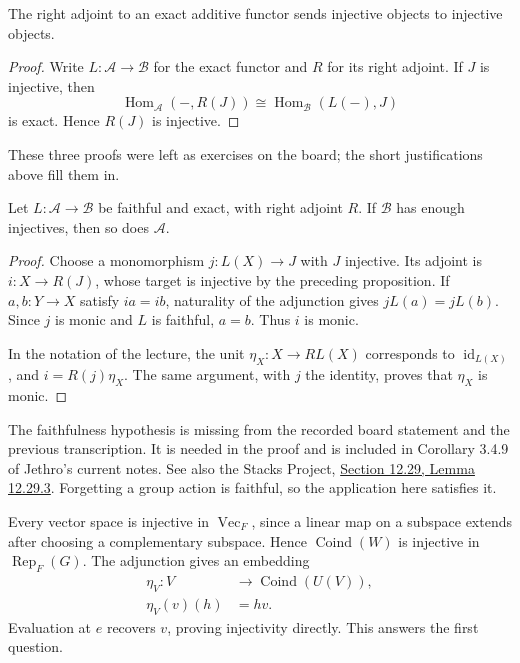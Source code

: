 \begin{proposition}
\label{proposition-adjoint-injective-4-sept}
The right adjoint to an exact additive
functor sends injective objects to
injective objects.
\end{proposition}

\begin{proof}
Write $L:\mathcal A\to\mathcal B$ for
the exact functor and $R$ for its right
adjoint. If $J$ is injective, then
$$
\operatorname{Hom}_{\mathcal A}(-,R(J))
\cong\operatorname{Hom}_{\mathcal B}(L(-),J)
$$
is exact. Hence $R(J)$ is injective.
\end{proof}

\noindent
These three proofs were left as exercises
on the board; the short justifications
above fill them in.

\begin{corollary}
\label{lemma-adjoint-injectives-4-sept}
Let $L:\mathcal A\to\mathcal B$ be
faithful and exact, with right adjoint
$R$. If $\mathcal B$ has enough
injectives, then so does $\mathcal A$.
\end{corollary}

\begin{proof}
Choose a monomorphism $j:L(X)\to J$
with $J$ injective. Its adjoint is
$i:X\to R(J)$, whose target is injective
by the preceding proposition.
If $a,b:Y\to X$ satisfy $ia=ib$,
naturality of the adjunction gives
$jL(a)=jL(b)$. Since $j$ is monic and
$L$ is faithful, $a=b$. Thus $i$ is monic.

In the notation of the lecture, the unit
$\eta_X:X\to RL(X)$ corresponds to
$\operatorname{id}_{L(X)}$, and
$i=R(j)\eta_X$. The same argument, with
$j$ the identity, proves that $\eta_X$
is monic.
\end{proof}

\begin{remark}
\label{remark-faithfulness-4-sept}
The faithfulness hypothesis is missing
from the recorded board statement and
the previous transcription. It is needed
in the proof and is included in
Corollary 3.4.9 of Jethro's current notes.
See also the Stacks Project,
\href{https://stacks.math.columbia.edu/tag/%
015Y}{Section 12.29, Lemma 12.29.3}.
Forgetting a group action is faithful,
so the application here satisfies it.
\end{remark}

\noindent
Every vector space is injective in
$\operatorname{Vec}_F$, since a linear
map on a subspace extends after choosing
a complementary subspace. Hence
$\operatorname{Coind}(W)$ is injective
in $\operatorname{Rep}_F(G)$.
The adjunction gives an embedding
$$
\begin{aligned}
\eta_V:V&\to\operatorname{Coind}(U(V)),\\
\eta_V(v)(h)&=hv.
\end{aligned}
$$
Evaluation at $e$ recovers $v$, proving
injectivity directly. This answers the
first question.

